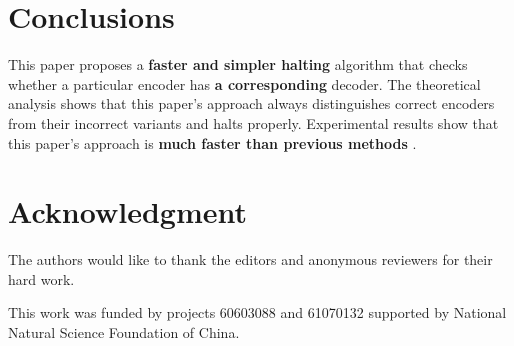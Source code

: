 \documentclass[journal]{IEEEtran}
\begin{document}
{%

\section{Conclusions}\label{sec_conclude}

This paper proposes a \textbf{faster and simpler halting} algorithm that checks whether a particular encoder has \textbf{a corresponding} decoder.
The theoretical analysis shows that this paper's approach always distinguishes correct encoders from their incorrect variants and halts properly.
Experimental results show that this paper's approach is \textbf{much faster than previous methods} \cite{ShengYuShen:fmcad10}.



\section*{Acknowledgment}
The authors would like to thank the editors and anonymous reviewers for their hard work.

This work was funded by projects 60603088 and 61070132 supported by National Natural Science Foundation of China.

%
%



}
\end{document}
